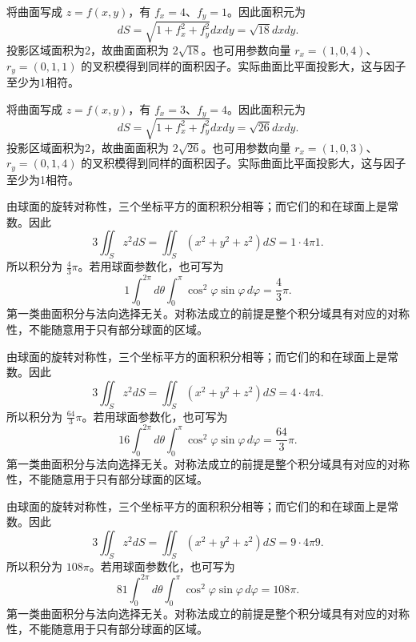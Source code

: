 \documentclass[UTF8,12pt,a4paper,fontset=fandol]{ctexart}
\begin{document}
\begin{solve}\label{ans:c43q5}
将曲面写成 $z=f(x,y)$，有 $f_x=4$、$f_y=1$。因此面积元为
\[
dS=\sqrt{1+f_x^2+f_y^2}dxdy=\sqrt{18}dxdy.
\]
投影区域面积为2，故曲面面积为 $2\sqrt{18}$。也可用参数向量 $r_x=(1,0,4)$、$r_y=(0,1,1)$ 的叉积模得到同样的面积因子。实际曲面比平面投影大，这与因子至少为1相符。
\end{solve}

\begin{solve}\label{ans:c43q6}
将曲面写成 $z=f(x,y)$，有 $f_x=3$、$f_y=4$。因此面积元为
\[
dS=\sqrt{1+f_x^2+f_y^2}dxdy=\sqrt{26}dxdy.
\]
投影区域面积为2，故曲面面积为 $2\sqrt{26}$。也可用参数向量 $r_x=(1,0,3)$、$r_y=(0,1,4)$ 的叉积模得到同样的面积因子。实际曲面比平面投影大，这与因子至少为1相符。
\end{solve}

\begin{solve}\label{ans:c43q7}
由球面的旋转对称性，三个坐标平方的面积积分相等；而它们的和在球面上是常数。因此
\[
3\iint_Sz^2dS=\iint_S(x^2+y^2+z^2)dS=1\cdot4\pi1.
\]
所以积分为 $\frac{4}{3}\pi$。若用球面参数化，也可写为
\[
1\int_0^{2\pi}d\theta\int_0^\pi\cos^2\varphi\sin\varphi\,d\varphi=\frac{4}{3}\pi.
\]
第一类曲面积分与法向选择无关。对称法成立的前提是整个积分域具有对应的对称性，不能随意用于只有部分球面的区域。
\end{solve}

\begin{solve}\label{ans:c43q8}
由球面的旋转对称性，三个坐标平方的面积积分相等；而它们的和在球面上是常数。因此
\[
3\iint_Sz^2dS=\iint_S(x^2+y^2+z^2)dS=4\cdot4\pi4.
\]
所以积分为 $\frac{64}{3}\pi$。若用球面参数化，也可写为
\[
16\int_0^{2\pi}d\theta\int_0^\pi\cos^2\varphi\sin\varphi\,d\varphi=\frac{64}{3}\pi.
\]
第一类曲面积分与法向选择无关。对称法成立的前提是整个积分域具有对应的对称性，不能随意用于只有部分球面的区域。
\end{solve}

\begin{solve}\label{ans:c43q9}
由球面的旋转对称性，三个坐标平方的面积积分相等；而它们的和在球面上是常数。因此
\[
3\iint_Sz^2dS=\iint_S(x^2+y^2+z^2)dS=9\cdot4\pi9.
\]
所以积分为 $108\pi$。若用球面参数化，也可写为
\[
81\int_0^{2\pi}d\theta\int_0^\pi\cos^2\varphi\sin\varphi\,d\varphi=108\pi.
\]
第一类曲面积分与法向选择无关。对称法成立的前提是整个积分域具有对应的对称性，不能随意用于只有部分球面的区域。
\end{solve}
\end{document}
